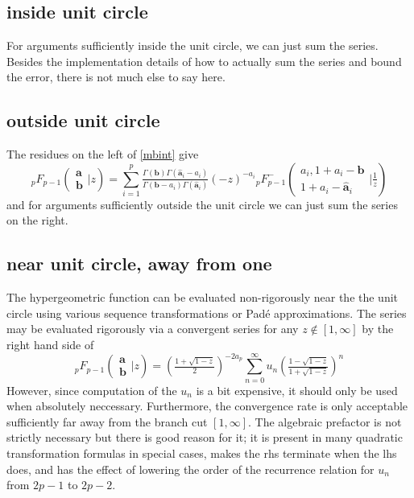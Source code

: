 \documentclass[12pt]{article}
\numberwithin{equation}{section}
\newcommand{\Head}[3] {{}_{#1}{#2}_{#3}}
\newcommand{\ArgS}[3] {( \begin{smallmatrix} #1 \\ #2 \end{smallmatrix} | {#3})}
\begin{document}
\subsection{inside unit circle}
For arguments sufficiently inside the unit circle, we can just sum the series. Besides the implementation details of how to actually sum the series and bound the error, there is not much else to say here.

\subsection{outside unit circle}
The residues on the left of \eqref{mbint} give
\begin{equation}
\label{balanced_outside}
\Head{p}{F}{p-1} \ArgS{\mathbf{a}}{\mathbf{b}}{z} = \sum_{i=1}^{p} \tfrac{\Gamma(\mathbf{b}) \Gamma(\hat{\mathbf{a}}_i-a_i)}{\Gamma(\mathbf{b}-a_i) \Gamma(\hat{\mathbf{a}}_i)} (-z)^{-a_i} \Head{p}{F}{p-1}^{-} \ArgS{a_i,1+a_i-\mathbf{b}}{1+a_i-\hat{\mathbf{a}}_i}{\tfrac{1}{z}}
\end{equation}
and for arguments sufficiently outside the unit circle we can just sum the series on the right.

\subsection{near unit circle, away from one}
The hypergeometric function can be evaluated non-rigorously near the the unit circle using various sequence transformations or Pad\'e approximations. The series may be evaluated rigorously via a convergent series for any $z \not \in [1,\infty]$ by the right hand side of
\begin{equation}
\label{balanced_anywhere}
\Head{p}{F}{p-1} \ArgS{\mathbf{a}}{\mathbf{b}}{z} = (\tfrac{1+\sqrt{1-z}}{2})^{-2 a_p} \sum_{n=0}^{\infty}u_n (\tfrac{1-\sqrt{1-z}}{1+\sqrt{1-z}})^n
\end{equation}
However, since computation of the $u_n$ is a bit expensive, it should only be used when absolutely neccessary. Furthermore, the convergence rate is only acceptable sufficiently far away from the branch cut $[1,\infty]$. The algebraic prefactor is not strictly necessary but there is good reason for it; it is present in many quadratic transformation formulas in special cases, makes the rhs terminate when the lhs does, and has the effect of lowering the order of the recurrence relation for $u_n$ from $2p-1$ to $2p-2$.
\end{document}
